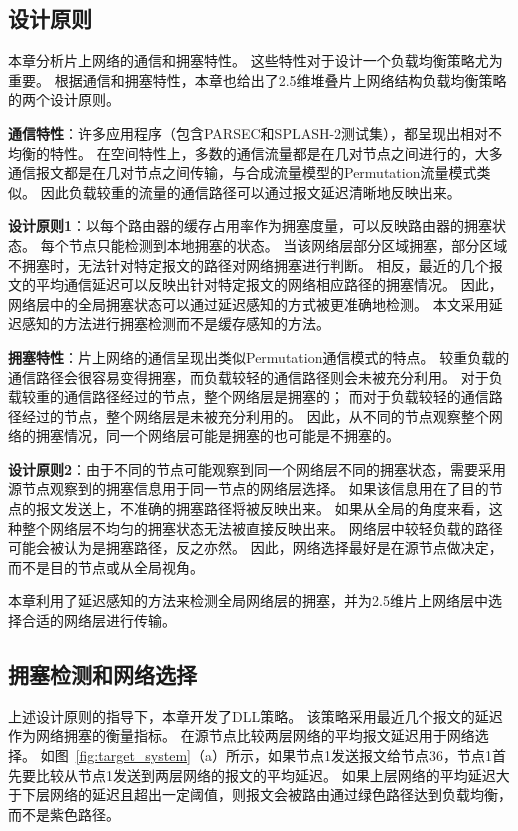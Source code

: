 \subsection{设计原则}

本章分析片上网络的通信和拥塞特性。
这些特性对于设计一个负载均衡策略尤为重要。
根据通信和拥塞特性，本章也给出了2.5维堆叠片上网络结构负载均衡策略的两个设计原则。

\textbf{通信特性}：许多应用程序（包含PARSEC和SPLASH-2测试集），都呈现出相对不均衡的特性。
在空间特性上，多数的通信流量都是在几对节点之间进行的，大多通信报文都是在几对节点之间传输，与合成流量模型的Permutation流量模式类似。
因此负载较重的流量的通信路径可以通过报文延迟清晰地反映出来。

\textbf{设计原则1}：以每个路由器的缓存占用率作为拥塞度量，可以反映路由器的拥塞状态。
每个节点只能检测到本地拥塞的状态。
当该网络层部分区域拥塞，部分区域不拥塞时，无法针对特定报文的路径对网络拥塞进行判断。
相反，最近的几个报文的平均通信延迟可以反映出针对特定报文的网络相应路径的拥塞情况。
因此，网络层中的全局拥塞状态可以通过延迟感知的方式被更准确地检测。
本文采用延迟感知的方法进行拥塞检测而不是缓存感知的方法。

\textbf{拥塞特性}：片上网络的通信呈现出类似Permutation通信模式的特点。
较重负载的通信路径会很容易变得拥塞，而负载较轻的通信路径则会未被充分利用。
对于负载较重的通信路径经过的节点，整个网络层是拥塞的；
而对于负载较轻的通信路径经过的节点，整个网络层是未被充分利用的。
因此，从不同的节点观察整个网络的拥塞情况，同一个网络层可能是拥塞的也可能是不拥塞的。

\textbf{设计原则2}：由于不同的节点可能观察到同一个网络层不同的拥塞状态，需要采用源节点观察到的拥塞信息用于同一节点的网络层选择。
如果该信息用在了目的节点的报文发送上，不准确的拥塞路径将被反映出来。
如果从全局的角度来看，这种整个网络层不均匀的拥塞状态无法被直接反映出来。
网络层中较轻负载的路径可能会被认为是拥塞路径，反之亦然。
因此，网络选择最好是在源节点做决定，而不是目的节点或从全局视角。

本章利用了延迟感知的方法来检测全局网络层的拥塞，并为2.5维片上网络层中选择合适的网络层进行传输。

\subsection{拥塞检测和网络选择}

上述设计原则的指导下，本章开发了DLL策略。
该策略采用最近几个报文的延迟作为网络拥塞的衡量指标。
在源节点比较两层网络的平均报文延迟用于网络选择。
如图~\ref{fig:target_system}（a）所示，如果节点1发送报文给节点36，节点1首先要比较从节点1发送到两层网络的报文的平均延迟。
如果上层网络的平均延迟大于下层网络的延迟且超出一定阈值，则报文会被路由通过绿色路径达到负载均衡，而不是紫色路径。

